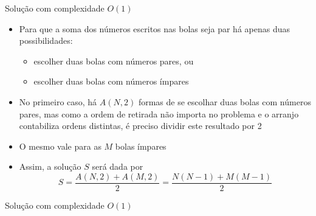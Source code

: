 \begin{frame}[fragile]{Solução com complexidade $O(1)$}

    \begin{itemize}
        \item Para que a soma dos números escritos nas bolas seja par há apenas duas
            possibilidades:
        \begin{itemize}
            \item escolher duas bolas com números pares, ou
            \item escolher duas bolas com números ímpares
        \end{itemize}

        \item No primeiro caso, há $A(N, 2)$ formas de se escolhar duas bolas com números
            pares, mas como a ordem de retirada não importa no problema e o arranjo contabiliza
            ordens distintas, é preciso dividir este resultado por 2

        \item O mesmo vale para as $M$ bolas ímpares

        \item Assim, a solução $S$ será dada por
        $$
            S = \frac{A(N, 2) + A(M, 2)}{2} = \frac{N(N - 1) + M(M - 1)}{2}
        $$
    \end{itemize}

\end{frame}

\begin{frame}[fragile]{Solução com complexidade $O(1)$}
\end{frame}
